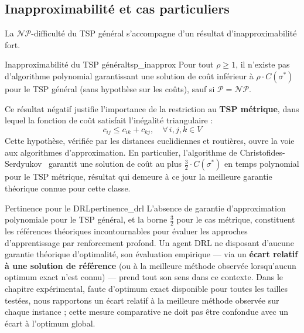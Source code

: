 \documentclass[12pt, a4paper, twoside, openright]{book}
\begin{document}
	
	\subsection{Inapproximabilit\'e et cas particuliers}
	\label{subsec:tsp_approx}
	
	La $\mathcal{NP}$-difficulté du TSP général s'accompagne d'un résultat
	d'inapproximabilité fort.
	
	\begin{theorem}{Inapproximabilité du TSP général}{tsp_inapprox}
		Pour tout $\rho \geq 1$, il n'existe pas d'algorithme polynomial
		garantissant une solution de coût inférieur à $\rho \cdot C(\sigma^*)$
		pour le TSP général (sans hypothèse sur les coûts), sauf si
		$\mathcal{P} = \mathcal{NP}$.
	\end{theorem}
	
	Ce résultat négatif justifie l'importance de la restriction au
	\textbf{TSP métrique}, dans lequel la fonction de coût satisfait
	l'inégalité triangulaire :
	$$
	c_{ij} \leq c_{ik} + c_{kj}, \quad \forall\, i, j, k \in V
	$$
	Cette hypothèse, vérifiée par les distances euclidiennes et routières, ouvre
	la voie aux algorithmes d'approximation. En particulier, l'algorithme de
	Christofides-Serdyukov~\cite{christofides1976worst} garantit une solution de coût au plus
	$\frac{3}{2} \cdot C(\sigma^*)$ en temps polynomial pour le TSP métrique,
	résultat qui demeure à ce jour la meilleure garantie théorique connue pour
	cette classe.
	
	\begin{remark}{Pertinence pour le DRL}{pertinence_drl}
		L'absence de garantie d'approximation polynomiale pour le TSP général,
		et la borne $\frac{3}{2}$ pour le cas métrique, constituent les
		références théoriques incontournables pour évaluer les approches
		d'apprentissage par renforcement profond. Un agent DRL ne disposant
		d'aucune garantie théorique d'optimalité, son évaluation empirique ---
		via un \textbf{écart relatif à une solution de référence} (ou à la meilleure
		méthode observée lorsqu'aucun optimum exact n'est connu) --- prend tout son
		sens dans ce contexte. Dans le chapitre expérimental, faute d'optimum exact disponible pour toutes les tailles testées, nous rapportons un écart relatif à la meilleure méthode observée sur chaque instance ; cette mesure comparative ne doit pas être confondue avec un écart à l'optimum global.
	\end{remark}
	
\end{document}
